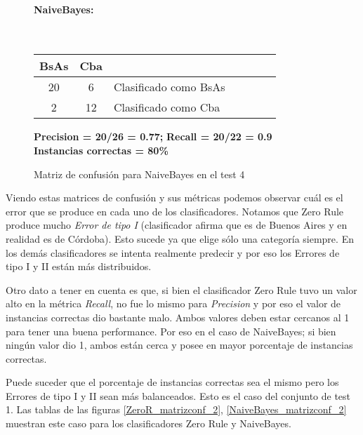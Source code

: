 \begin{figure}[H]
	\centering
	\paragraph*{NaiveBayes:}\mbox{}\\
	\begin{table}[H]
		\centering
		\begin{tabular}{|c|c|l|c|c|c|c|}
			\hline
			BsAs & Cba &  \\ \hline
			20 &  6 &  Clasificado como BsAs \\ \hline
			2  &  12 &  Clasificado como Cba \\ \hline
		\end{tabular}
	\end{table}
	\begin{center}
		\textbf{Precision = 20/26 = 0.77;} \textbf{Recall = 20/22 = 0.9}\\
		\textbf{Instancias correctas = 80\%}
	\end{center}
	\caption{Matriz de confusión para NaiveBayes en el test 4}
	\label{NaiveBayes_matrizconf}
\end{figure}

Viendo estas matrices de confusión y sus métricas podemos observar cuál es el error que se produce en cada uno de los clasificadores. Notamos que Zero Rule produce mucho \textit{Error de tipo I} (clasificador afirma que es de Buenos Aires y en realidad es de Córdoba). Esto sucede ya que elige sólo una categoría siempre. En los demás clasificadores se intenta realmente predecir y por eso los Errores de tipo I y II están más distribuidos.

Otro dato a tener en cuenta es que, si bien el clasificador Zero Rule tuvo un valor alto en la métrica \textit{Recall}, no fue lo mismo para \textit{Precision} y por eso el valor de instancias correctas dio bastante malo. Ambos valores deben estar cercanos al 1 para tener una buena performance. Por eso en el caso de NaiveBayes; si bien ningún valor dio 1, ambos están cerca y posee en mayor porcentaje de instancias correctas.

Puede suceder que el porcentaje de instancias correctas sea el mismo pero los Errores de tipo I y II sean más balanceados. Esto es el caso del conjunto de test 1. Las tablas de las figuras \ref{ZeroR_matrizconf_2}, \ref{NaiveBayes_matrizconf_2} muestran este caso para los clasificadores Zero Rule y NaiveBayes.


